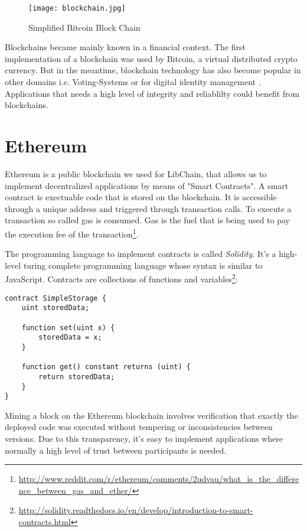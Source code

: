 \vspace{0.3cm}
\begin{figure}[ht]
  \centering
   \texttt{[image: blockchain.jpg]}
  	\caption{Simplified Bitcoin Block Chain}
\end{figure}

Blockchains became mainly known in a financial context. The first implementation of a blockchain was used by Bitcoin, a virtual distributed crypto currency.
But in the meantime, blockchain technology has also become popular in other domains i.e. Voting-Systems \cite{yermack2017corporate} or for digital identity management \cite{isaen}. Applications that needs a high level of integrity and reliablilty could benefit from blockchains.

\section{Ethereum}
Ethereum is a public blockchain we used for LibChain, that allows us to implement decentralized applications by means of "Smart Contracts". A smart contract is exectuable code that is stored on the blockchain. It is accessible through a unique address and triggered through transaction calls.
To execute a transaction so called gas is consumed. Gas is the fuel that is being used to pay the execution fee of the transaction\footnote{\url{http://www.reddit.com/r/ethereum/comments/2udvau/what_is_the_difference_between_gas_and_ether/}}.

The programming language to implement contracts is called \textit{Solidity}. It's a high-level turing complete programming language whose syntax is similar to JavaScript. Contracts are collections of functions and variables\footnote{\url{http://solidity.readthedocs.io/en/develop/introduction-to-smart-contracts.html}}:
\vspace{0.3cm}
\begin{lstlisting}
contract SimpleStorage {
    uint storedData;

    function set(uint x) {
        storedData = x;
    }

    function get() constant returns (uint) {
        return storedData;
    }
}
\end{lstlisting}
\vspace{0.3cm}
Mining a block on the Ethereum blockchain involves verification that exactly the deployed code was executed without tempering or inconsistencies between versions. Due to this transparency, it's easy to implement applications where normally a high level of trust between participants is needed.